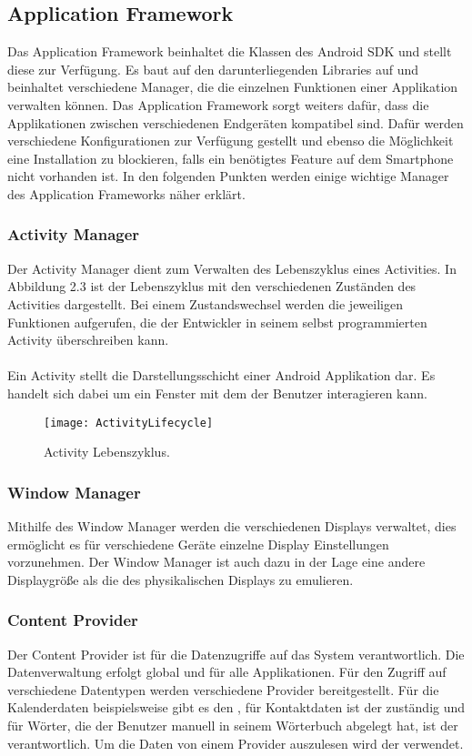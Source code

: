 \subsection{Application Framework}
Das Application Framework beinhaltet die Klassen des Android SDK und stellt diese zur Verfügung. Es baut auf den darunterliegenden Libraries auf und beinhaltet verschiedene Manager, die die einzelnen Funktionen einer Applikation verwalten können. Das Application Framework sorgt weiters dafür, dass die Applikationen zwischen verschiedenen Endgeräten kompatibel sind. Dafür werden verschiedene Konfigurationen zur Verfügung gestellt und ebenso die Möglichkeit eine Installation zu blockieren, falls ein benötigtes Feature auf dem Smartphone nicht vorhanden ist. In den folgenden Punkten werden einige wichtige Manager des Application Frameworks näher erklärt.\cite{19}

\subsubsection{Activity Manager}
Der Activity Manager dient zum Verwalten des Lebenszyklus eines Activities. In Abbildung 2.3 ist der Lebenszyklus mit den verschiedenen Zuständen des Activities dargestellt. Bei einem Zustandswechsel werden die jeweiligen Funktionen aufgerufen, die der Entwickler in seinem selbst programmierten Activity überschreiben kann. 
\\
\\
Ein Activity stellt die Darstellungsschicht einer Android Applikation dar. Es handelt sich dabei um ein Fenster mit dem der Benutzer interagieren kann.\cite{21}

\begin{figure}
\centering
\texttt{[image: ActivityLifecycle]}
\caption{Activity Lebenszyklus.\cite{22}}
\label{fig:ActivityLifecycle}
\end{figure}

\subsubsection{Window Manager}
Mithilfe des Window Manager werden die verschiedenen Displays verwaltet, dies ermöglicht es für verschiedene Geräte einzelne Display Einstellungen vorzunehmen. Der Window Manager ist auch dazu in der Lage eine andere Displaygröße als die des physikalischen Displays zu emulieren.\cite{23}\cite{24}


\subsubsection{Content Provider}
Der Content Provider ist für die Datenzugriffe auf das System verantwortlich. Die Datenverwaltung erfolgt global und für alle Applikationen. Für den Zugriff auf verschiedene Datentypen werden verschiedene Provider bereitgestellt. Für die Kalenderdaten beispielsweise gibt es den , für Kontaktdaten ist der  zuständig und für Wörter, die der Benutzer manuell in seinem Wörterbuch abgelegt hat, ist der  verantwortlich. Um die Daten von einem Provider auszulesen wird der  verwendet.\cite{25}


